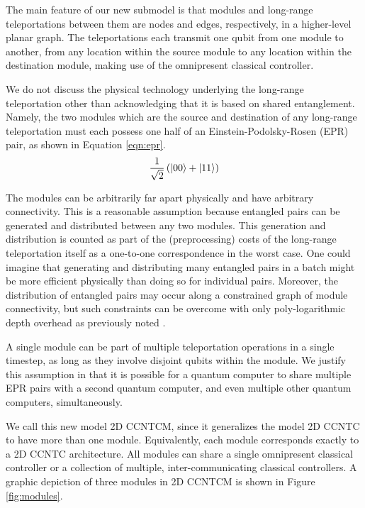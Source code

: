 The main feature of our new submodel is that modules
and long-range teleportations between them are nodes and edges, respectively,
in a higher-level planar graph. The teleportations each transmit one qubit
from one module to another, from any location within the source module
to any location within the destination module, making use of the
omnipresent classical controller.

We do not discuss the physical technology underlying the long-range
teleportation other than acknowledging that it is based on shared
entanglement. Namely, the two modules which are the source and destination
of any long-range teleportation must each possess one half of an
Einstein-Podolsky-Rosen (EPR) pair, as shown in Equation \ref{eqn:epr}.
%
\begin{equation}
\frac{1}{\sqrt{2}} \left( \left\vert{00}\right\rangle + \left\vert{11}\right\rangle \right)
\label{eqn:epr}
\end{equation}


 The modules can be arbitrarily far
apart physically and have arbitrary connectivity. This is a reasonable
assumption because entangled pairs can be generated and distributed between
any two modules. This generation and distribution is counted as part of
the (preprocessing) costs of the long-range teleportation itself as a
one-to-one correspondence in the worst case. One could imagine that 
generating and distributing many entangled pairs in a batch might be more
efficient physically than doing so for individual pairs. Moreover, the
distribution of entangled pairs may occur along a constrained graph of
module connectivity, but such constraints can be overcome with only
poly-logarithmic depth overhead as previously noted \cite{Beals2012}.

A single module can be part of multiple teleportation operations in a single
timestep, as long as they involve disjoint qubits within the module.
We justify this assumption in that it is
possible for a quantum computer to share multiple EPR pairs with a
second quantum computer, and even multiple other quantum computers,
simultaneously.

We call this new model \textsf{2D CCNTCM}, since it generalizes the
model \textsf{2D CCNTC} to have more than one module. Equivalently,
each module corresponds exactly to a \textsf{2D CCNTC} architecture.
All modules can share a single omnipresent
classical controller or a collection of multiple, inter-communicating classical controllers.
A graphic depiction of three modules in \textsf{2D CCNTCM} is shown in
Figure \ref{fig:modules}.

